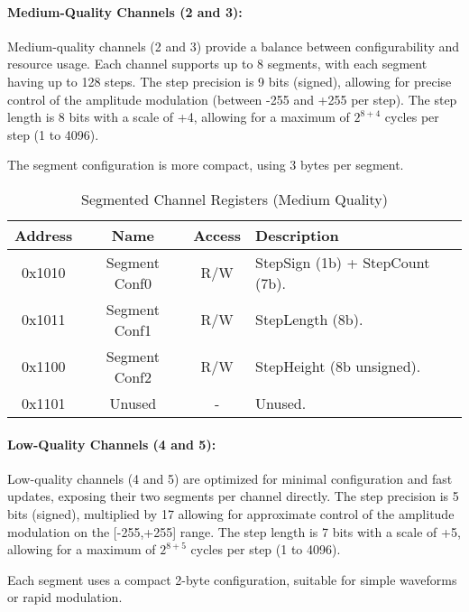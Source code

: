 \paragraph{Medium-Quality Channels (2 and 3):}
Medium-quality channels (2 and 3) provide a balance between configurability and resource usage.
Each channel supports up to 8 segments, with each segment having up to 128 steps.
The step precision is 9 bits (signed), allowing for precise control of the amplitude modulation (between -255 and +255 per step).
The step length is 8 bits with a scale of +4, allowing for a maximum of $2^{8+4}$ cycles per step (1 to 4096).

The segment configuration is more compact, using 3 bytes per segment.

\begin{table}[H]
    \centering
    \begin{tabular}{|c|c|c|l|}
        \hline
        \textbf{Address} & \textbf{Name}        & \textbf{Access} & \textbf{Description} \\
        \hline
        0x1010 & Segment Conf0   & R/W   & StepSign (1b) + StepCount (7b). \\
        0x1011 & Segment Conf1   & R/W   & StepLength (8b). \\
        0x1100 & Segment Conf2   & R/W   & StepHeight (8b unsigned). \\
        0x1101 & Unused          & -     & Unused. \\
        \hline
    \end{tabular}
    \caption{Segmented Channel Registers (Medium Quality)}
\end{table}

\paragraph{Low-Quality Channels (4 and 5):}
Low-quality channels (4 and 5) are optimized for minimal configuration and fast updates, exposing their two segments per channel directly.
The step precision is 5 bits (signed), multiplied by 17 allowing for approximate control of the amplitude modulation on the [-255,+255] range.
The step length is 7 bits with a scale of +5, allowing for a maximum of $2^{8+5}$ cycles per step (1 to 4096).

Each segment uses a compact 2-byte configuration, suitable for simple waveforms or rapid modulation.

